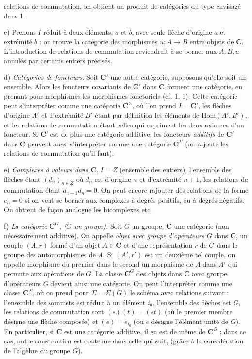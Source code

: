 
\noindent relations de commutation, on obtient un produit de catégories du
type envisagé dans 1.

c) Prenons $I$ réduit à deux éléments, $a$ et $b$, avec seule flèche
d'origine $a$ et extrémité $b$ : on trouve la catégorie des morphismes
$u:A\to B$ entre objets de $\mathbf{C}$. L'introduction de relations de
commutation reviendrait à se borner aux $A,B,u$ annulés par certains entiers
précisés.

d) \textit{Catégories de foncteurs.} Soit $\mathbf{C}'$ une autre catégorie,
supposons qu'elle soit un ensemble. Alors les foncteurs covariants de $\mathbf{C}'$ dans
$\mathbf{C}$ forment une catégorie, en prenant pour morphismes les morphismes
fonctoriels (cf. 1, 1). Cette catégorie peut s'interpréter comme une catégorie
$\mathbf{C}^\Sigma$, où l'on prend $I=\mathbf{C}'$, les flèches d'origine $A'$ et d'extrémité
$B'$ étant par définition les éléments de $\mathrm{Hom}(A',B')$, et les
relations de commutation étant celles qui expriment les deux axiomes d'un
foncteur. Si $\mathbf{C}'$ est de plus une catégorie additive, les foncteurs
\textit{additifs} de $\mathbf{C}'$ dans $\mathbf{C}$ peuvent aussi s'interpréter comme une
catégorie $\mathbf{C}^\Sigma$ (on rajoute les relations de commutation qu'il faut).

e) \textit{Complexes à valeurs dans $\mathbf{C}$.} $I=Z$ (ensemble
des entiers), l'ensemble des flèches étant $(d_n)_{n\in Z}$ où $d_n$
est d'origine $n$ et d'extrémité $n+1$, les relations de commutation étant
$d_{n+1}d_n=0$. On peut encore rajouter des relations de la forme $e_n=0$ si
on veut se borner aux complexes à degrés positifs, ou à degrés négatifs. On
obtient de façon analogue les bicomplexes etc.

f) \textit{La catégorie $\mathbf{C}^G$, ($G$ un groupe).} Soit $G$ un groupe,
$\mathbf{C}$ une catégorie (non nécessairement additive). On appelle \textit{objet avec
groupe d'opérateurs $G$} dans $\mathbf{C}$, un couple $(A,r)$ formé d'un objet $A\in \mathbf{C}$
et d'une représentation $r$ de $G$ dans le groupe des automorphismes de $A$.
Si $(A',r')$ est un deuxième tel couple, on appelle morphisme du premier dans
le second un morphisme de $A$ dans $A'$ qui permute aux opérations de $G$. La
classe $\mathbf{C}^G$ des objets dans $\mathbf{C}$ avec groupe d'opérateurs $G$ devient ainsi une
catégorie. On peut l'interpréter comme une classe $\mathbf{C}^\Sigma$, où on prend pour
$\Sigma=\Sigma(G)$ le schéma avec relations suivant : l'ensemble des sommets
est réduit à un élément $i_0$, l'ensemble des flèches est $G$, les relations de
commutation sont $(s)(t)=(st)$ (où le premier membre désigne une flèche
composée) et $(e)=e_{i_0}$ (ou $e$ désigne l'élément unité de $G$). En
particulier, si $\mathbf{C}$ est une catégorie additive, il en est de même de $\mathbf{C}^G$ ;
dans ce cas, notre construction est contenue dans celle qui suit, (grâce à la
considération de l'algèbre du groupe $G$).

